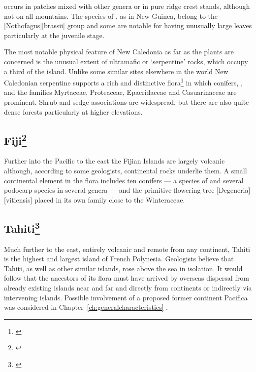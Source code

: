  occurs in patches mixed with other genera or in pure ridge crest stands, although not on all mountains.
The species of , as in New Guinea, belong to the [Nothofagus][brassii] group and some are notable for having unusually large leaves particularly at the juvenile stage.

The most notable physical feature of New Caledonia as far as the plants are concerned is the unusual extent of ultramafic or `serpentine' rocks, which occupy a third of the island.
Unlike some similar sites elsewhere in the world New Caledonian serpentine supports a rich and distinctive flora\footnote{\cite{moratph1986affinites}} in which conifers, , and the families Myrtaceae, Proteaceae, Epacridaceae and Casuarinaceae are prominent.
Shrub and sedge associations are widespread, but there are also quite dense forests particularly at higher elevations.

\subsection[Fiji]{Fiji\thinspace\footnote{\cite{carlquist1965island}}}

Further into the Pacific to the east the Fijian Islands are largely volcanic although, according to some geologists, continental rocks underlie them.
A small continental element in the flora includes ten conifers --- a species of  and several podocarp species in several genera --- and the primitive flowering tree [Degeneria][vitiensis] placed in its own family close to the Winteraceae.

\subsection[Tahiti]{Tahiti\thinspace\footnote{\cite{carlquist1965island}}}

Much further to the east, entirely volcanic and remote from any continent, Tahiti is the highest and largest island of French Polynesia.
Geologists believe that Tahiti, as well as other similar islands, rose above the sea in isolation.
It would follow that the ancestors of its flora must have arrived by overseas dispersal from already existing islands near and far and directly from continents or indirectly via intervening islands.
Possible involvement of a proposed former continent Pacifica was considered in Chapter~\ref{ch:generalcharacteristics} .

